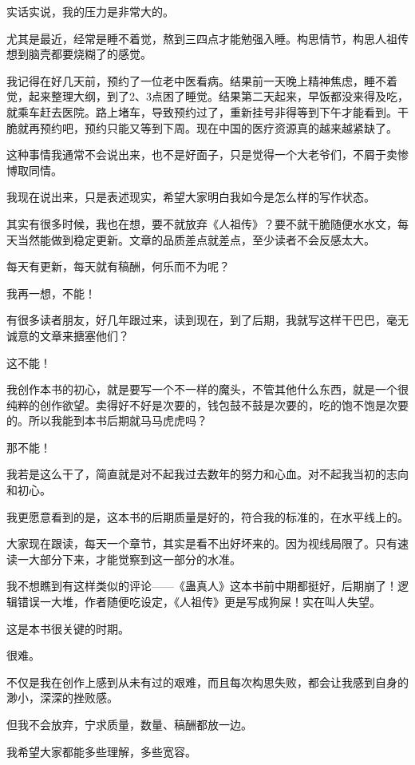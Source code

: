 \begin{this_body}
实话实说，我的压力是非常大的。

尤其是最近，经常是睡不着觉，熬到三四点才能勉强入睡。构思情节，构思人祖传想到脑壳都要烧糊了的感觉。

我记得在好几天前，预约了一位老中医看病。结果前一天晚上精神焦虑，睡不着觉，起来整理大纲，到了2、3点困了睡觉。结果第二天起来，早饭都没来得及吃，就乘车赶去医院。路上堵车，导致预约过了，重新挂号非得等到下午才能看到。干脆就再预约吧，预约只能又等到下周。现在中国的医疗资源真的越来越紧缺了。

这种事情我通常不会说出来，也不是好面子，只是觉得一个大老爷们，不屑于卖惨博取同情。

我现在说出来，只是表述现实，希望大家明白我如今是怎么样的写作状态。

其实有很多时候，我也在想，要不就放弃《人祖传》？要不就干脆随便水水文，每天当然能做到稳定更新。文章的品质差点就差点，至少读者不会反感太大。

每天有更新，每天就有稿酬，何乐而不为呢？

我再一想，不能！

有很多读者朋友，好几年跟过来，读到现在，到了后期，我就写这样干巴巴，毫无诚意的文章来搪塞他们？

这不能！

我创作本书的初心，就是要写一个不一样的魔头，不管其他什么东西，就是一个很纯粹的创作欲望。卖得好不好是次要的，钱包鼓不鼓是次要的，吃的饱不饱是次要的。所以我能到本书后期就马马虎虎吗？

那不能！

我若是这么干了，简直就是对不起我过去数年的努力和心血。对不起我当初的志向和初心。

我更愿意看到的是，这本书的后期质量是好的，符合我的标准的，在水平线上的。

大家现在跟读，每天一个章节，其实是看不出好坏来的。因为视线局限了。只有速读一大部分下来，才能觉察到这一部分的水准。

我不想瞧到有这样类似的评论——《蛊真人》这本书前中期都挺好，后期崩了！逻辑错误一大堆，作者随便吃设定，《人祖传》更是写成狗屎！实在叫人失望。

这是本书很关键的时期。

很难。

不仅是我在创作上感到从未有过的艰难，而且每次构思失败，都会让我感到自身的渺小，深深的挫败感。

但我不会放弃，宁求质量，数量、稿酬都放一边。

我希望大家都能多些理解，多些宽容。


\end{this_body}
